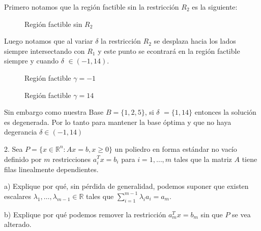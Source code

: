 \documentclass{article}
\begin{document}
\begin{flushleft}
		Primero notamos que la región factible sin la restricción $R_2$ es la siguiente:\\

		\begin{figure}[ht]
			\centering
			\caption{Región factible sin $R_2$}
			\label{fig:grafico}
		\end{figure}

		Luego notamos que al variar $\delta$ la restricción $R_2$ se desplaza hacia los lados siempre intersectando con $R_1$ y este punto se econtrará en la región factible siempre y cuando $\delta$ $\in (-1,14)$.\\ 

		\begin{figure}[ht]
			\centering
			\caption{Región factible $\gamma = -1$}
			\label{fig:grafico}
		\end{figure}

		\begin{figure}[ht]
			\centering
			\caption{Región factible $\gamma = 14$}
			\label{fig:grafico}
		\end{figure}

		\vspace{4cm}

		Sin embargo como nuestra Base $B = \{1,2,5\}$, si $\delta$ $= \{1,14\}$ entonces la solución es degenerada. Por lo tanto para mantener la base óptima y que no haya degerancia $\delta \in (-1,14)$ \\

		\vspace{1cm}



		2. Sea $P = \{x \in \mathbb{R}^n : Ax = b, x \geq 0\}$ un poliedro en forma estándar no vacío definido por $m$ restricciones $a_i^T x = b_i$ para $i = 1, \ldots, m$ tales que la matriz $A$ tiene filas linealmente dependientes.\\
		\vspace{0,5cm}

		a) Explique por qué, sin pérdida de generalidad, podemos suponer que existen escalares $\lambda_1, \ldots, \lambda_{m-1} \in \mathbb{R}$ tales que $\sum_{i=1}^{m-1} \lambda_i a_i = a_m$.\\
		\vspace{0,5cm}

		b) Explique por qué podemos remover la restricción $a_m^T x = b_m$ sin que $P$ se vea alterado.\\
		\vspace{0,5cm}


\end{flushleft}
\end{document}
